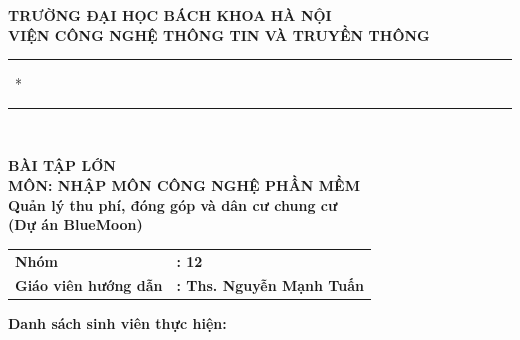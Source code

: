 \documentclass[12pt,a4paper]{article}
\begin{document}
\begin{titlepage}

\begin{center}
    \singlespacing
    \large\textbf{TRƯỜNG ĐẠI HỌC BÁCH KHOA HÀ NỘI} \\
    \small\textbf{VIỆN CÔNG NGHỆ THÔNG TIN VÀ TRUYỀN THÔNG} \\
    \small\rule{3cm}{0.4pt}\, * \,\rule{3cm}{0.4pt} \\
    \vspace{15mm}
    
    \vspace{15mm}
    
    \Huge\textbf{BÀI TẬP LỚN} \\
    \vspace{5mm}
    \Large\textbf{MÔN: NHẬP MÔN CÔNG NGHỆ PHẦN MỀM} \\
    \vspace{15mm}
    \huge\textbf{Quản lý thu phí, đóng góp và dân cư chung cư} \\
    \vspace{5mm}
    \large\textbf{(Dự án BlueMoon)} \\
    \vspace{15mm}
    
    \normalsize
    \begin{tabular}{ll}
        \textbf{Nhóm} & \textbf{: 12} \\
        \textbf{Giáo viên hướng dẫn} & \textbf{: Ths. Nguyễn Mạnh Tuấn} \\
    \end{tabular}
    
    \vspace{5mm}
    \textbf{Danh sách sinh viên thực hiện:} \\
    \vspace{3mm}
    

\end{center}
\end{titlepage}
\end{document}

